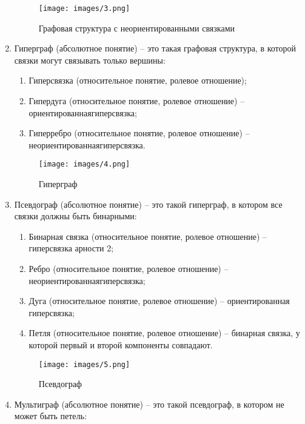 \begin{enumerate}
\begin{figure}[H]
  \centering
  \texttt{[image: images/3.png]}
  \caption{Графовая структура с неориентированными связками}
\end{figure}

\item
  Гиперграф (абсолютное понятие) -- это такая графовая структура, в
  которой связки могут связывать только вершины:

  \begin{enumerate}
  \item
    Гиперсвязка (относительное понятие, ролевое отношение);
  \item
    Гипердуга (относительное понятие, ролевое отношение) --
    ориентированнаягиперсвязка;
  \item
    Гиперребро (относительное понятие, ролевое отношение) --
    неориентированнаягиперсвязка.
  \end{enumerate}

\begin{figure}[H]
  \centering
  \texttt{[image: images/4.png]}
  \caption{Гиперграф}
\end{figure}

\item
  Псевдограф (абсолютное понятие) -- это такой гиперграф, в котором все
  связки должны быть бинарными:

  \begin{enumerate}
  \item
    Бинарная связка (относительное понятие, ролевое отношение)
    --гиперсвязка арности 2;
  \item
    Ребро (относительное понятие, ролевое отношение)
    --неориентированнаягиперсвязка;
  \item
    Дуга (относительное понятие, ролевое отношение) -- ориентированная
    гиперсвязка;
  \item
    Петля (относительное понятие, ролевое отношение) -- бинарная связка,
    у которой первый и второй компоненты совпадают.
  \end{enumerate}

\begin{figure}[H]
  \centering
  \texttt{[image: images/5.png]}
  \caption{Псевдограф}
\end{figure}

\item
  Мультиграф (абсолютное понятие) -- это такой псевдограф, в котором не
  может быть петель:


\end{enumerate}
